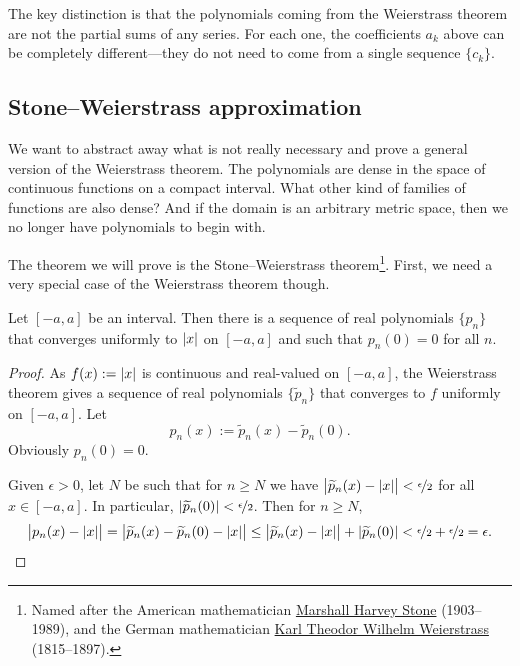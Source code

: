 The key distinction is that
the polynomials coming from the Weierstrass theorem are not the partial
sums of any series.  For each one, the coefficients $a_k$ above can be
completely different---they do not need to come from a single sequence $\{
c_k \}$.

\subsection{Stone--Weierstrass approximation}

We want to abstract away what is not really
necessary and prove a general version of the Weierstrass theorem.
The polynomials are dense in the space of continuous
functions on a compact interval.  What other kind of families of
functions are also dense?  And if the domain is an
arbitrary metric space, then we no longer have polynomials
to begin with.

The theorem we will prove is the Stone--Weierstrass theorem\footnote{%
Named after the American mathematician
\href{https://en.wikipedia.org/wiki/Marshall_Harvey_Stone}{Marshall Harvey Stone}
(1903--1989), and the German mathematician
\href{https://en.wikipedia.org/wiki/Karl_Weierstrass}{Karl Theodor Wilhelm Weierstrass}
(1815--1897).}.
First,
we need a very
special case of the Weierstrass theorem though.

\begin{cor}
Let $[-a,a]$ be an interval.  Then there is a sequence of real polynomials
$\{ p_n \}$ that converges uniformly to $\lvert {x} \rvert$ on $[-a,a]$ and such that
$p_n(0) = 0$ for all $n$.
\end{cor}

\begin{proof}
As $f(x) := \lvert {x} \rvert$ is continuous and real-valued
on $[-a,a]$, the Weierstrass theorem gives a sequence of
real polynomials $\{ \widetilde{p}_n \}$ that converges to $f$
uniformly on $[-a,a]$.
Let
\begin{equation*}
p_n(x) := \widetilde{p}_n(x) - \widetilde{p}_n(0) .
\end{equation*}
Obviously $p_n(0) = 0$.

Given $\epsilon > 0$, let $N$ be such that
for $n \geq N$ we have
$\bigl\lvert\widetilde{p}_n(x)-\lvert {x} \rvert\big\rvert <
\nicefrac{\epsilon}{2}$ for all $x \in [-a,a]$.
In particular,
$\lvert {\widetilde{p}_n(0)} \rvert < \nicefrac{\epsilon}{2}$.
Then for $n \geq N$,
\begin{equation*}
\bigl\lvert p_n(x)-\lvert {x} \rvert \bigr\rvert
=
\bigl\lvert \widetilde{p}_n(x) - \widetilde{p}_n(0) - \lvert {x} \rvert \bigr\rvert
\leq
\bigl\lvert \widetilde{p}_n(x) - \lvert {x} \rvert \bigr\rvert + \lvert {\widetilde{p}_n(0)} \rvert < 
\nicefrac{\epsilon}{2} + \nicefrac{\epsilon}{2} = \epsilon . \qedhere
\end{equation*}
\end{proof}

